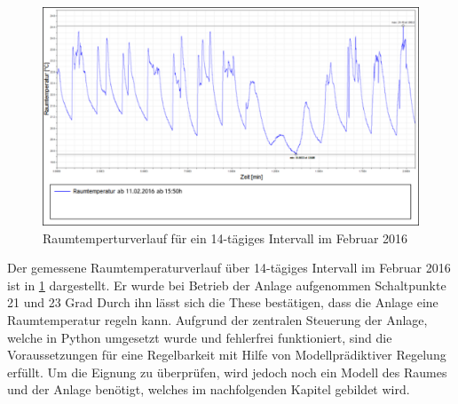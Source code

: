 \begin{figure}
\centering
\includegraphics[width=\textwidth]{abbildungen/20160330_regelung}
\caption{Raumtemperturverlauf für ein 14-tägiges Intervall im Februar 2016}
\label{fig:regelung}
\end{figure}

Der gemessene Raumtemperaturverlauf über 14-tägiges Intervall im Februar 2016 ist in \ref{fig:regelung} dargestellt. Er wurde bei Betrieb der Anlage aufgenommen Schaltpunkte 21 und 23 Grad Durch ihn lässt sich die These bestätigen, dass die Anlage eine Raumtemperatur regeln kann.
Aufgrund der zentralen Steuerung der Anlage, welche in Python umgesetzt wurde und fehlerfrei funktioniert, sind die Voraussetzungen für eine Regelbarkeit mit Hilfe von Modellprädiktiver Regelung erfüllt. Um die Eignung zu überprüfen, wird jedoch noch ein Modell des Raumes und der Anlage benötigt, welches im nachfolgenden Kapitel gebildet wird.